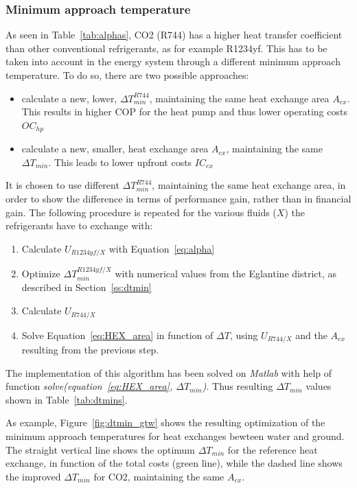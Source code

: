 \documentclass{article}
\begin{document}
\subsubsection{Minimum approach temperature}
As seen in Table~\ref{tab:alphas}, CO2 (R744) has a higher heat transfer coefficient than other conventional refrigerants, as for example R1234yf. This has to be taken into account in the energy system through a different minimum approach temperature. To do so, there are two possible approaches:
\begin{itemize}
	\item calculate a new, lower, $\Delta T_{min}^{R744}$, maintaining the same heat exchange area $A_{ex}$. This results in higher COP for the heat pump and thus lower operating costs $OC_{hp}$
	\item calculate a new, smaller, heat exchange area  $A_{ex}$, maintaining the same $\Delta T_{min}$. This leads to lower upfront costs $IC_{ex}$
\end{itemize}

It is chosen to use different $\Delta T_{min}^{R744}$, maintaining the same heat exchange area, in order to show the difference in terms of performance gain, rather than in financial gain. The following procedure is repeated for the various fluids ($X$) the refrigerants have to exchange with:
\begin{enumerate}
	\item Calculate $U_{R1234yf/X}$ with Equation~\ref{eq:alpha}
	\item Optimize $\Delta T_{min}^{R1234yf/X}$ with numerical values from the Eglantine district, as described in Section~\ref{ss:dtmin}
	\item Calculate  $U_{R744/X}$ 
	\item Solve Equation~\ref{eq:HEX_area} in function of $\Delta T$, using $U_{R744/X}$ and the $A_{ex}$ resulting from the previous step.
\end{enumerate}

The implementation of this algorithm has been solved on \textit{Matlab} with help of function \textit{solve(equation~\ref{eq:HEX_area}, $\Delta T_{min}$)}.
Thus resulting $\Delta T_{min}$ values shown in Table~\ref{tab:dtmins}.



As example, Figure~\ref{fig:dtmin_gtw} shows the resulting optimization of the minimum approach temperatures for heat exchanges bewteen water and ground. The straight vertical line shows the optimum $\Delta T_{min}$ for the reference heat exchange, in function of the total costs (green line), while the dashed line shows the improved $\Delta T_{min}$ for CO2, maintaining the same $A_{ex}$.
\end{document}
